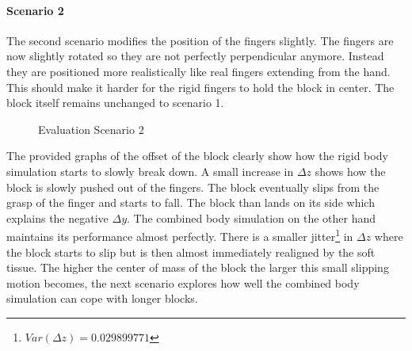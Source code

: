 \clearpage
\paragraph{Scenario 2}
The second scenario modifies the position of the fingers slightly. The fingers are now slightly rotated so they are not perfectly perpendicular anymore. Instead they are positioned more realistically like real fingers extending from the hand. This should make it harder for the rigid fingers to hold the block in center. The block itself remains unchanged to scenario 1.

\begin{figure}[htb]
	\centering
	\caption{Evaluation Scenario 2}
\end{figure}

The provided graphs of the offset of the block clearly show how the rigid body simulation starts to slowly break down. A small increase in $\Delta z$ shows how the block is slowly pushed out of the fingers. The block eventually slips from the grasp of the finger and starts to fall. The block than lands on its side which explains the negative $\Delta y$. The combined body simulation on the other hand maintains its performance almost perfectly. There is a smaller jitter\footnote{$Var(\Delta z)=0.029899771$} in $\Delta z$ where the block starts to slip but is then almost immediately realigned by the soft tissue. The higher the center of mass of the block the larger this small slipping motion becomes, the next scenario explores how well the combined body simulation can cope with longer blocks.

